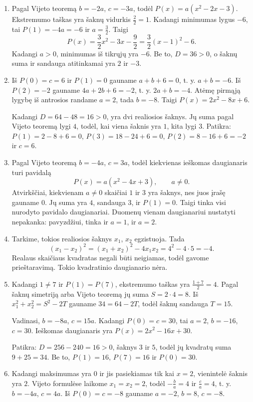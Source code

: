 \documentclass[12pt,a4paper]{article}
\begin{document}
\begin{enumerate}
Jei ženklo sąlygos nebūtų, tiktų ir $a=2$: antrasis daugianaris būtų $2x^2-8x+6$. Jo šaknų suma, sandauga ir diskriminantas tokie patys.
\item Pagal Vijeto teoremą $b=-2a$, $c=-3a$, todėl $P(x)=a(x^2-2x-3)$. Ekstremumo taškas yra šaknų vidurkis $\frac{2}{2}=1$. Kadangi minimumas lygus $-6$, tai $P(1)=-4a=-6$ ir $a=\frac{3}{2}$. Taigi
\[P(x)=\frac{3}{2}x^2-3x-\frac{9}{2}=\frac{3}{2}(x-1)^2-6.\]
Kadangi $a>0$, minimumas iš tikrųjų yra $-6$. Be to, $D=36>0$, o šaknų suma ir sandauga atitinkamai yra $2$ ir $-3$.
\item Iš $P(0)=c=6$ ir $P(1)=0$ gauname $a+b+6=0$, t. y. $a+b=-6$. Iš $P(2)=-2$ gauname $4a+2b+6=-2$, t. y. $2a+b=-4$. Atėmę pirmąją lygybę iš antrosios randame $a=2$, tada $b=-8$. Taigi $P(x)=2x^2-8x+6$.

Kadangi $D=64-48=16>0$, yra dvi realiosios šaknys. Jų suma pagal Vijeto teoremą lygi $4$, todėl, kai viena šaknis yra $1$, kita lygi $3$. Patikra: $P(1)=2-8+6=0$, $P(3)=18-24+6=0$, $P(2)=8-16+6=-2$ ir $c=6$.
\item Pagal Vijeto teoremą $b=-4a$, $c=3a$, todėl kiekvienas ieškomas daugianaris turi pavidalą
\[P(x)=a(x^2-4x+3),\qquad a\ne0.\]
Atvirkščiai, kiekvienam $a\ne0$ skaičiai $1$ ir $3$ yra šaknys, nes juos įrašę gauname $0$. Jų suma yra $4$, sandauga $3$, ir $P(1)=0$. Taigi tinka visi nurodyto pavidalo daugianariai. Duomenų vienam daugianariui nustatyti nepakanka: pavyzdžiui, tinka ir $a=1$, ir $a=2$.
\item Tarkime, tokios realiosios šaknys $x_1$, $x_2$ egzistuoja. Tada
\[(x_1-x_2)^2=(x_1+x_2)^2-4x_1x_2=4^2-4\cdot5=-4.\]
Realaus skaičiaus kvadratas negali būti neigiamas, todėl gavome prieštaravimą. Tokio kvadratinio daugianario nėra.
\item Kadangi $1\ne7$ ir $P(1)=P(7)$, ekstremumo taškas yra $\frac{1+7}{2}=4$. Pagal šaknų simetriją arba Vijeto teoremą jų suma $S=2\cdot4=8$. Iš $x_1^2+x_2^2=S^2-2T$ gauname $34=64-2T$, todėl šaknų sandauga $T=15$.

Vadinasi, $b=-8a$, $c=15a$. Kadangi $P(0)=c=30$, tai $a=2$, $b=-16$, $c=30$. Ieškomas daugianaris yra $P(x)=2x^2-16x+30$.

Patikra: $D=256-240=16>0$, šaknys $3$ ir $5$, todėl jų kvadratų suma $9+25=34$. Be to, $P(1)=16$, $P(7)=16$ ir $P(0)=30$.
\item Kadangi maksimumas yra $0$ ir jis pasiekiamas tik kai $x=2$, vienintelė šaknis yra $2$. Vijeto formulėse laikome $x_1=x_2=2$, todėl $-\frac{b}{a}=4$ ir $\frac{c}{a}=4$, t. y. $b=-4a$, $c=4a$. Iš $P(0)=c=-8$ gauname $a=-2$, $b=8$, $c=-8$.


\end{enumerate}
\end{document}
